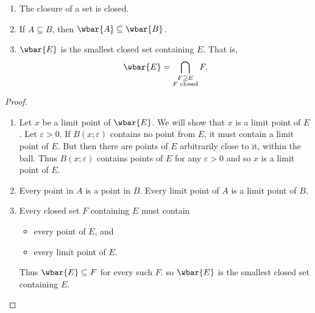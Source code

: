 \begin{theorem*} \label{thm:closed:prop} \leavevmode
    \begin{enumerate}
        \item The closure of a set is closed.
        \item If $A \subseteq B$, then $\wbar{A} \subseteq \wbar{B}$.
        \item $\wbar{E}$ is the smallest closed set containing $E$.
        That is, \[
            \wbar{E} = \bigcap_{\substack{F \supseteq E \\ F \text{ closed}}} F.
        \]
    \end{enumerate}
\end{theorem*}
\begin{proof} \leavevmode
    \begin{enumerate}
        \item Let $x$ be a limit point of $\wbar{E}$.
        We will show that $x$ is a limit point of $E$.
        Let $\varepsilon > 0$.
        If $B(x; \varepsilon)$ contains no point from $E$,
        it must contain a limit point of $E$.
        But then there are points of $E$ arbitrarily close to it,
        within the ball.
        Thus $B(x; \varepsilon)$ contains points of $E$ for any
        $\varepsilon > 0$ and so $x$ is a limit point of $E$.
        \item Every point in $A$ is a point in $B$.
        Every limit point of $A$ is a limit point of $B$.
        \item Every closed set $F$ containing $E$ must contain
        \begin{itemize}
            \item every point of $E$, and
            \item every limit point of $E$.
        \end{itemize}
        Thus $\wbar{E} \subseteq F$ for every such $F$.
        so $\wbar{E}$ is the smallest closed set containing $E$. \qedhere
    \end{enumerate}
\end{proof}

